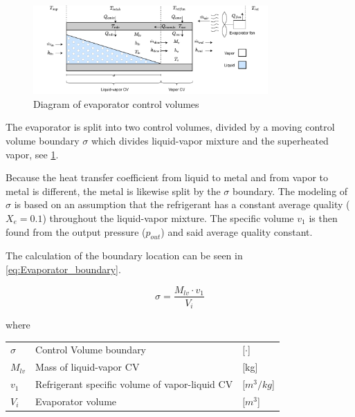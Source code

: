 \clearpage

\begin{figure}[h!]
	\centering
	\includegraphics[width=0.8\textwidth]{Graphics/Evaporator_CV_diagram.pdf}
	\caption{Diagram of evaporator control volumes}
	\label{fig:evap_CV}
\end{figure}

The evaporator is split into two control volumes, divided by a moving control volume boundary $\sigma$ which divides liquid-vapor mixture and the superheated vapor, see \cref{fig:evap_CV}.

Because the heat transfer coefficient from liquid to metal and from vapor to metal is different, the metal is likewise split by the $\sigma$ boundary. The modeling of $\sigma$ is based on an assumption that the refrigerant has a constant average quality ($X_e = 0.1$) throughout the liquid-vapor mixture. The specific volume $v_1$ is then found from the output pressure ($p_{out}$) and said average quality constant.

The calculation of the boundary location can be seen in \cref{eq:Evaporator_boundary}.

\begin{equation} \label{eq:Evaporator_boundary}
	\sigma = \frac{M_{lv} \cdot v_1}{V_i}
\end{equation}

where

\begin{center}
	\begin{tabular}{l p{8cm} l}
		$\sigma$ & Control Volume boundary                        & [$\cdot$]            \\
		$M_{lv}$ & Mass of liquid-vapor CV                        & [\si{kg}]            \\
		$v_1$    & Refrigerant specific volume of vapor-liquid CV & [$\si{m}^3/\si{kg}$] \\
		$V_i$    & Evaporator volume                              & [$\si{m}^3$]
	\end{tabular}
\end{center}

